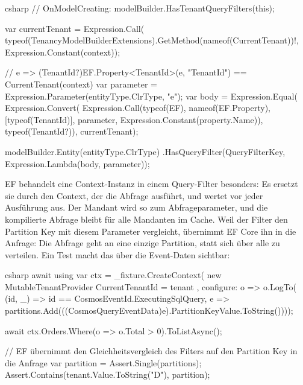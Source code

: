 \begin{sourcecode}{csharp}
// OnModelCreating: modelBuilder.HasTenantQueryFilters(this);

var currentTenant = Expression.Call(
    typeof(TenancyModelBuilderExtensions).GetMethod(nameof(CurrentTenant))!,
    Expression.Constant(context));

// e => (TenantId?)EF.Property<TenantId>(e, "TenantId") == CurrentTenant(context)
var parameter = Expression.Parameter(entityType.ClrType, "e");
var body = Expression.Equal(
    Expression.Convert(
        Expression.Call(typeof(EF), nameof(EF.Property), [typeof(TenantId)],
            parameter, Expression.Constant(property.Name)),
        typeof(TenantId?)),
    currentTenant);

modelBuilder.Entity(entityType.ClrType)
    .HasQueryFilter(QueryFilterKey, Expression.Lambda(body, parameter));
\end{sourcecode}

EF behandelt eine Context-Instanz in einem Query-Filter besonders: Es ersetzt sie durch den
Context, der die Abfrage ausführt, und wertet
 vor jeder Ausführung aus. Der Mandant
wird so zum Abfrageparameter, und die kompilierte Abfrage bleibt für alle Mandanten im Cache.
Weil der Filter den Partition Key mit diesem Parameter vergleicht, übernimmt EF Core ihn in die
Anfrage: Die Abfrage geht an eine einzige Partition, statt sich über alle zu verteilen. Ein Test
macht das über die Event-Daten sichtbar:

\begin{sourcecode}{csharp}
await using var ctx = _fixture.CreateContext(
    new MutableTenantProvider { CurrentTenantId = tenant },
    configure: o => o.LogTo(
        (id, _) => id == CosmosEventId.ExecutingSqlQuery,
        e => partitions.Add(((CosmosQueryEventData)e).PartitionKeyValue.ToString())));

await ctx.Orders.Where(o => o.Total > 0).ToListAsync();

// EF übernimmt den Gleichheitsvergleich des Filters auf den Partition Key in die Anfrage
var partition = Assert.Single(partitions);
Assert.Contains(tenant.Value.ToString("D"), partition);
\end{sourcecode}

